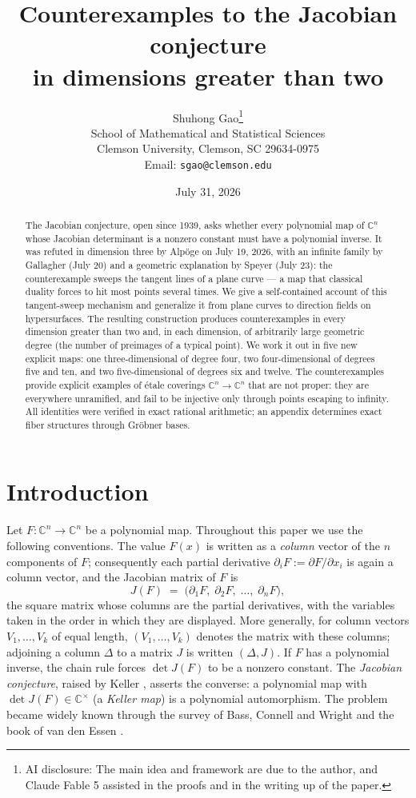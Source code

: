 \documentclass[11pt]{article}
\title{Counterexamples to the Jacobian conjecture\\ in dimensions greater than two}
\author{Shuhong Gao\thanks{AI disclosure: The main idea and framework are
due to the author, and Claude Fable 5 assisted in the proofs and in the writing
up of the paper.}\\[4pt]
\normalsize School of Mathematical and Statistical Sciences\\
Clemson University, Clemson, SC 29634-0975\\
Email: \texttt{sgao@clemson.edu}}
\date{July 31, 2026}
\theoremstyle{plain}
\theoremstyle{definition}
\theoremstyle{remark}
\newcommand{\C}{\mathbb{C}}
\begin{document}
\maketitle

\begin{abstract}
The Jacobian conjecture, open since 1939, asks whether every polynomial map of
$\C^n$ whose Jacobian determinant is a nonzero constant must have a polynomial
inverse. It was refuted in dimension three by Alp\"oge on July 19, 2026, with
an infinite family by Gallagher (July 20) and a geometric explanation by
Speyer (July 23): the counterexample sweeps the tangent lines of a plane
curve --- a map that classical duality forces to hit most points several
times. We give a self-contained account of this tangent-sweep mechanism and
generalize it from plane curves to direction fields on hypersurfaces. The
resulting construction produces counterexamples in every dimension greater
than two and, in each dimension, of arbitrarily large geometric degree (the
number of preimages of a typical point). We work it out in five new explicit
maps: one three-dimensional of degree four, two four-dimensional of degrees
five and ten, and two five-dimensional of degrees six and twelve. The
counterexamples provide explicit examples of \'etale coverings
$\C^n\to\C^n$ that are not proper: they are everywhere unramified, and fail
to be injective only through points escaping to infinity. All identities were
verified in exact rational arithmetic; an appendix determines exact fiber
structures through Gr\"obner bases.
\end{abstract}

\section{Introduction}

Let $F\colon\C^n\to\C^n$ be a polynomial map. Throughout this paper we use the
following conventions. The value $F(x)$ is written as a \emph{column} vector of
the $n$ components of $F$; consequently each partial derivative
$\partial_iF:=\partial F/\partial x_i$ is again a column vector, and the Jacobian
matrix of $F$ is
\[
J(F)\;=\;\bigl(\partial_1F,\;\partial_2F,\;\dots,\;\partial_nF\bigr),
\]
the square matrix whose columns are the partial derivatives, with the variables
taken in the order in which they are displayed. More generally, for column
vectors $V_1,\dots,V_k$ of equal length, $(V_1,\dots,V_k)$ denotes the matrix
with these columns; adjoining a column $\Delta$ to a matrix $J$ is written
$(\Delta,J)$. If $F$ has a polynomial inverse, the chain rule forces $\det J(F)$
to be a nonzero constant. The \emph{Jacobian conjecture}, raised by Keller
\cite{Keller1939}, asserts the converse: a polynomial map with
$\det J(F)\in\C^\times$ (a \emph{Keller map}) is a polynomial automorphism. The
problem became widely known through the survey of Bass, Connell and Wright
\cite{BCW1982} and the book of van den Essen \cite{Essen2000}.
\end{document}
